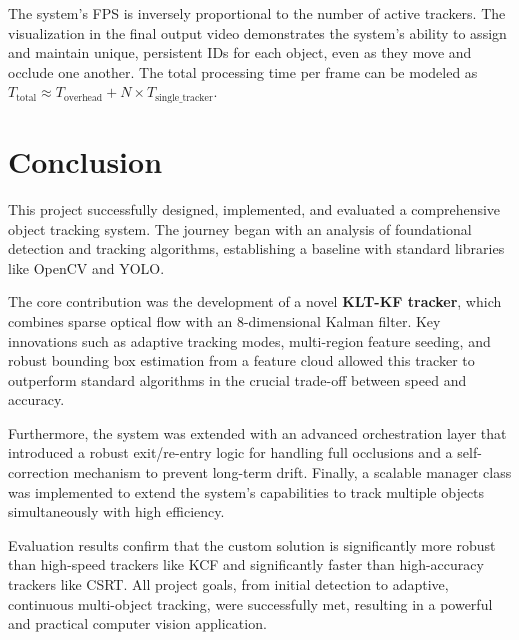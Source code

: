 \documentclass[12pt, a4paper]{article}
\begin{document}
The system's FPS is inversely proportional to the number of active trackers. The visualization in the final output video demonstrates the system's ability to assign and maintain unique, persistent IDs for each object, even as they move and occlude one another. The total processing time per frame can be modeled as $T_{\text{total}} \approx T_{\text{overhead}} + N \times T_{\text{single\_tracker}}$.

\section{Conclusion}
This project successfully designed, implemented, and evaluated a comprehensive object tracking system. The journey began with an analysis of foundational detection and tracking algorithms, establishing a baseline with standard libraries like OpenCV and YOLO.

The core contribution was the development of a novel \textbf{KLT-KF tracker}, which combines sparse optical flow with an 8-dimensional Kalman filter. Key innovations such as adaptive tracking modes, multi-region feature seeding, and robust bounding box estimation from a feature cloud allowed this tracker to outperform standard algorithms in the crucial trade-off between speed and accuracy.

Furthermore, the system was extended with an advanced orchestration layer that introduced a robust exit/re-entry logic for handling full occlusions and a self-correction mechanism to prevent long-term drift. Finally, a scalable manager class was implemented to extend the system's capabilities to track multiple objects simultaneously with high efficiency.

Evaluation results confirm that the custom solution is significantly more robust than high-speed trackers like KCF and significantly faster than high-accuracy trackers like CSRT. All project goals, from initial detection to adaptive, continuous multi-object tracking, were successfully met, resulting in a powerful and practical computer vision application.


\end{document}
